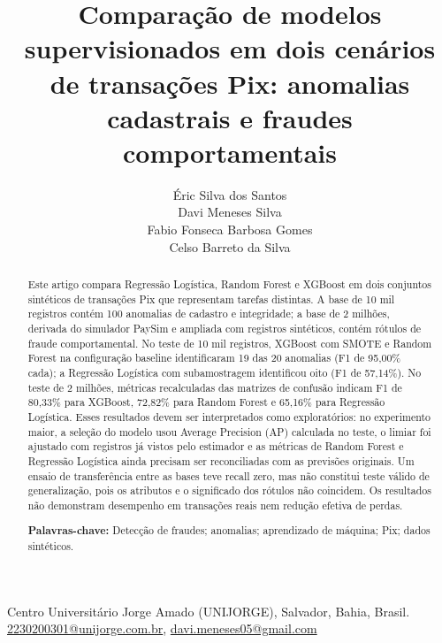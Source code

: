 \documentclass[11pt,a4paper]{article}
\title{\textbf{Comparação de modelos supervisionados em dois cenários de transações Pix: anomalias cadastrais e fraudes comportamentais}}
\author{Éric Silva dos Santos\\Davi Meneses Silva\\Fabio Fonseca Barbosa Gomes\\Celso Barreto da Silva}
\date{}
\begin{document}
\maketitle

\begin{center}
Centro Universitário Jorge Amado (UNIJORGE), Salvador, Bahia, Brasil.\\
\href{mailto:2230200301@unijorge.com.br}{2230200301@unijorge.com.br},
\href{mailto:davi.meneses05@gmail.com}{davi.meneses05@gmail.com}
\end{center}

\begin{abstract}
Este artigo compara Regressão Logística, Random Forest e XGBoost em dois conjuntos sintéticos de transações Pix que representam tarefas distintas. A base de 10 mil registros contém 100 anomalias de cadastro e integridade; a base de 2 milhões, derivada do simulador PaySim e ampliada com registros sintéticos, contém rótulos de fraude comportamental. No teste de 10 mil registros, XGBoost com SMOTE e Random Forest na configuração baseline identificaram 19 das 20 anomalias (F1 de 95,00\% cada); a Regressão Logística com subamostragem identificou oito (F1 de 57,14\%). No teste de 2 milhões, métricas recalculadas das matrizes de confusão indicam F1 de 80,33\% para XGBoost, 72,82\% para Random Forest e 65,16\% para Regressão Logística. Esses resultados devem ser interpretados como exploratórios: no experimento maior, a seleção do modelo usou Average Precision (AP) calculada no teste, o limiar foi ajustado com registros já vistos pelo estimador e as métricas de Random Forest e Regressão Logística ainda precisam ser reconciliadas com as previsões originais. Um ensaio de transferência entre as bases teve recall zero, mas não constitui teste válido de generalização, pois os atributos e o significado dos rótulos não coincidem. Os resultados não demonstram desempenho em transações reais nem redução efetiva de perdas.

\medskip
\noindent\textbf{Palavras-chave:} Detecção de fraudes; anomalias; aprendizado de máquina; Pix; dados sintéticos.
\end{abstract}
\end{document}
